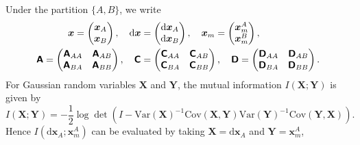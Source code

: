 Under the partition $\{A,B\}$, we write
\begin{equation*}
    \begin{aligned}
        \bm x=
        \begin{pmatrix}
            \bm x_A\\\bm x_B
        \end{pmatrix},
        \quad
        \mathrm{d}\bm x&=
        \begin{pmatrix}
            \mathrm{d}\bm x_A\\\mathrm{d}\bm x_B
        \end{pmatrix},
        \quad
        \bm x_m=
        \begin{pmatrix}
            \bm{x}_m^A\\\bm x_m^B
        \end{pmatrix},
        \\
        \boldsymbol{\mathsf{A}}=\begin{pmatrix}
            \boldsymbol{\mathsf{A}}_{AA} & \boldsymbol{\mathsf{A}}_{AB} \\
            \boldsymbol{\mathsf{A}}_{BA} & \boldsymbol{\mathsf{A}}_{BB}
        \end{pmatrix},
        \quad
        \boldsymbol{\mathsf{C}}&=\begin{pmatrix}
            \boldsymbol{\mathsf{C}}_{AA} & \boldsymbol{\mathsf{C}}_{AB} \\
            \boldsymbol{\mathsf{C}}_{BA} & \boldsymbol{\mathsf{C}}_{BB}
        \end{pmatrix},
        \quad
        \boldsymbol{\mathsf{D}}=\begin{pmatrix}
            \boldsymbol{\mathsf{D}}_{AA} & \boldsymbol{\mathsf{D}}_{AB} \\
            \boldsymbol{\mathsf{D}}_{BA} & \boldsymbol{\mathsf{D}}_{BB}
        \end{pmatrix}.
    \end{aligned}
\end{equation*}
For Gaussian random variables $\bm X$ and $\bm Y$, the mutual information $I(\bm X;\bm Y)$ is given by
\[
    I(\bm X;\bm Y)
    =-\frac{1}{2}\log\det\left(
    I-\mathrm{Var}(\bm X)^{-1}
    \mathrm{Cov}(\bm X, \bm Y)
    \mathrm{Var}(\bm Y)^{-1}
    \mathrm{Cov}(\bm Y,\bm X)
    \right).
\]
Hence $I(\mathrm{d}\bm x_A;\bm x_m^A)$ can be evaluated by taking $\bm X=\mathrm d\bm x_A$ and $\bm Y=\bm x_m^A$,
